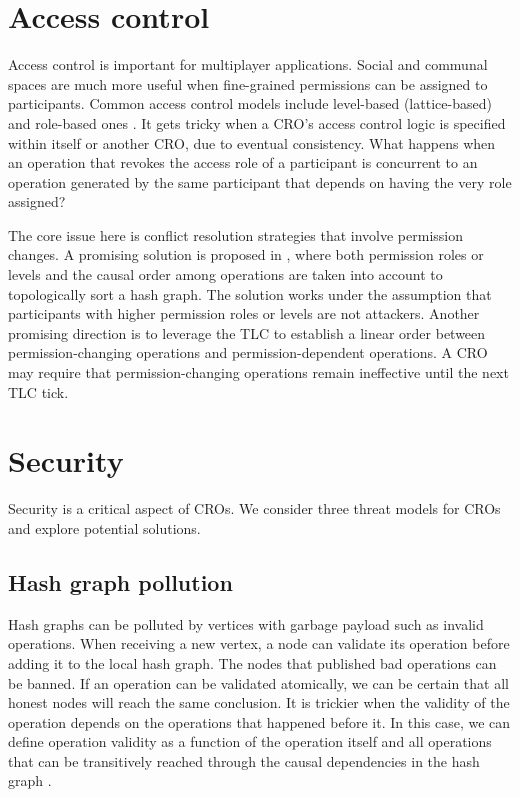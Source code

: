\documentclass{article}
\begin{document}
\section{Access control}
\label{sec:headings}

Access control is important for multiplayer applications. Social and communal spaces are much more useful when fine-grained permissions can be assigned to participants. Common access control models include level-based (lattice-based) \cite{LBAC} and role-based ones \cite{RBAC}. It gets tricky when a CRO's access control logic is specified within itself or another CRO, due to eventual consistency. What happens when an operation that revokes the access role of a participant is concurrent to an operation generated by the same participant that depends on having the very role assigned?

The core issue here is conflict resolution strategies that involve permission changes. A promising solution is proposed in \cite{Matrix}, where both permission roles or levels and the causal order among operations are taken into account to topologically sort a hash graph. The solution works under the assumption that participants with higher permission roles or levels are not attackers. Another promising direction is to leverage the TLC to establish a linear order between permission-changing operations and permission-dependent operations. A CRO may require that permission-changing operations remain ineffective until the next TLC tick.

\section{Security}
\label{sec:headings}

Security is a critical aspect of CROs. We consider three threat models for CROs and explore potential solutions.

\subsection {Hash graph pollution}
Hash graphs can be polluted by vertices with garbage payload such as invalid operations. When receiving a new vertex, a node can validate its operation before adding it to the local hash graph. The nodes that published bad operations can be banned. If an operation can be validated atomically, we can be certain that all honest nodes will reach the same conclusion. It is trickier when the validity of the operation depends on the operations that happened before it. In this case, we can define operation validity as a function of the operation itself and all operations that can be transitively reached through the causal dependencies in the hash graph \cite{BFT-CRDT}.
\end{document}
